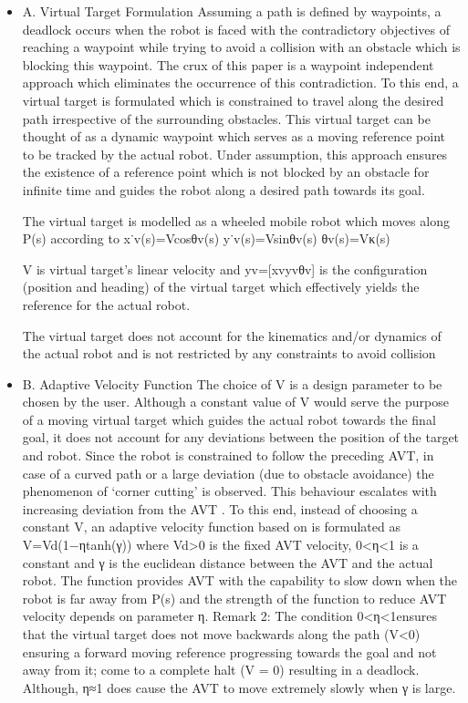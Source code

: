 \documentclass[sigplan,screen]{acmart}
\begin{document}
\begin{itemize}
\item A. Virtual Target Formulation
Assuming a path is defined by waypoints, a deadlock occurs when the robot is faced with the contradictory objectives of reaching a waypoint while trying to avoid a collision with an obstacle which is blocking this waypoint. The crux of this paper is a waypoint independent approach which eliminates the occurrence of this contradiction. To this end, a virtual target is formulated which is constrained to travel along the desired path irrespective of the surrounding obstacles. This virtual target can be thought of as a dynamic waypoint which serves as a moving reference point to be tracked by the actual robot. Under assumption, this approach ensures the existence of a reference point which is not blocked by an obstacle for infinite time and guides the robot along a desired path towards its goal.

The virtual target is modelled as a wheeled mobile robot which moves along P(s) according to
x˙v(s)=Vcosθv(s)
y˙v(s)=Vsinθv(s)
θv(s)=Vκ(s)

V is virtual target’s linear velocity and yv=[xvyvθv] is the configuration (position and heading) of the virtual target which effectively yields the reference for the actual robot.

The virtual target does not account for the kinematics and/or dynamics of the actual robot and is not restricted by any constraints to avoid collision

\item B. Adaptive Velocity Function
The choice of  V is a design parameter to be chosen by the user. Although a constant value of  V would serve the purpose of a moving virtual target which guides the actual robot towards the final goal, it does not account for any deviations between the position of the target and robot. Since the robot is constrained to follow the preceding AVT, in case of a curved path or a large deviation (due to obstacle avoidance) the phenomenon of ‘corner cutting’ is observed. This behaviour escalates with increasing deviation from the AVT . To this end, instead of choosing a constant V, an adaptive velocity function based on  is formulated as
V=Vd(1−ηtanh(γ))
where Vd>0 is the fixed AVT velocity, 0<η<1 is a constant and 
γ is the euclidean distance between the AVT and the actual robot. The function provides AVT with the capability to slow down when the robot is far away from P(s) and the strength of the function to reduce AVT velocity depends on parameter η.
Remark 2:
The condition 0<η<1ensures that the virtual target does not
move backwards along the path (V<0) ensuring a forward moving reference progressing towards the goal and not away from it;
come to a complete halt (V = 0) resulting in a deadlock. Although, η≈1 does cause the AVT to move extremely slowly when γ is large.
\end{itemize}
\end{document}
